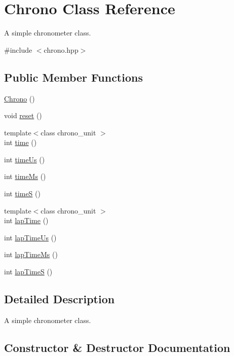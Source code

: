 \hypertarget{class_chrono}{}\section{Chrono Class Reference}
\label{class_chrono}


A simple chronometer class.  




{\ttfamily \#include $<$chrono.\+hpp$>$}

\subsection*{Public Member Functions}
\begin{DoxyCompactItemize}
\item 
\hyperlink{class_chrono_a3ac5e047174f389e7bd8aae71c6b5e8c}{Chrono} ()
\item 
void \hyperlink{class_chrono_a027be23720616639bc610a98c53740ea}{reset} ()
\item 
{\footnotesize template$<$class chrono\+\_\+unit $>$ }\\int \hyperlink{class_chrono_a224beb8f4bebc02d2a12dcf29ba6e5c9}{time} ()
\item 
int \hyperlink{class_chrono_ac358f9278ad6089d8fe626b3fe558590}{time\+Us} ()
\item 
int \hyperlink{class_chrono_a823638d3248d0cdd9f01ef6c840ad1d2}{time\+Ms} ()
\item 
int \hyperlink{class_chrono_a52c5348d69e89324a3430584cb760651}{timeS} ()
\item 
{\footnotesize template$<$class chrono\+\_\+unit $>$ }\\int \hyperlink{class_chrono_a3edbf874477c7342f066b539e7bc493c}{lap\+Time} ()
\item 
int \hyperlink{class_chrono_ab5ef782998bb0c75ecf7cf43db8ce8a0}{lap\+Time\+Us} ()
\item 
int \hyperlink{class_chrono_ab43a3526cac90d1c50da457c817cdef0}{lap\+Time\+Ms} ()
\item 
int \hyperlink{class_chrono_a91702be8978d2a969d27c2098ba41196}{lap\+TimeS} ()
\end{DoxyCompactItemize}


\subsection{Detailed Description}
A simple chronometer class. 

\subsection{Constructor \& Destructor Documentation}
\mbox{\label{class_chrono_a3ac5e047174f389e7bd8aae71c6b5e8c}} 
